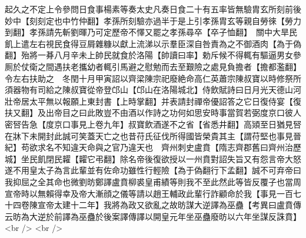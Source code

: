 起久之不定上令參問日食事楊素等奏太史凡奏日食二十有五率皆無驗胄玄所刻前後妙中【刻刻定也中竹仲翻】孝孫所刻驗亦過半于是上引孝孫胄玄等親自勞徠【勞力到翻】孝孫請先斬劉暉乃可定歷帝不懌又罷之孝孫尋卒【卒子恤翻】　關中大旱民飢上遣左右視民食得豆屑雜糠以獻上流涕以示羣臣深自咎責為之不御酒肉【為于偽翻】殆將一朞八月辛未上帥民就食於洛陽【帥讀曰率】勅斥候不得輒有驅逼男女參厠於仗衛之間遇扶老攜幼者輒引馬避之慰勉而去至艱險之處見負擔者【擔都濫翻】令左右扶助之　冬閏十月甲寅詔以齊梁陳宗祀廢絶命高仁英蕭宗陳叔寶以時修祭所須器物有司給之陳叔寶從帝登邙山【邙山在洛陽城北】侍飲賦詩曰日月光天德山河壯帝居太平無以報願上東封書【上時掌翻】并表請封禪帝優詔答之它日復侍宴【復扶又翻】及出帝目之曰此敗豈不由酒以作詩之功何如思安時事當賀若弼度京口彼人密唘告急【度京口事見上卷九年】叔寶飲酒遂不之省【省悉井翻】高熲至日猶見唘在牀下未開封此誠可笑蓋天亡之也昔苻氏征伐所得國皆榮貴其主【謂苻堅也事見晉紀】苟欲求名不知違天命與之官乃違天也　齊州刺史盧賁【隋志齊郡舊曰齊州治歷城】坐民飢閉民糶【糶它弔翻】除名帝後復欲授以一州賁對詔失旨又有怨言帝大怒遂不用皇太子為言此輩並有佐命功雖性行輕險【為于偽翻行下孟翻】誠不可弃帝曰我抑屈之全其命也微劉昉鄭譯盧賁柳裘皇甫績等則我不至此然此等皆反覆子也當周宣帝時以無賴得幸及帝大漸顔之儀等請以趙王輔政此輩行詐顧命於我【事見一百七十四卷陳宣帝太建十二年】我將為政又欲亂之故昉謀大逆譯為巫蠱【考異曰盧賁傳云昉為大逆於前譯為巫蠱於後案譯傳譯以開皇元年坐巫蠱廢昉以六年坐謀反誅賁】<br />
<br />
